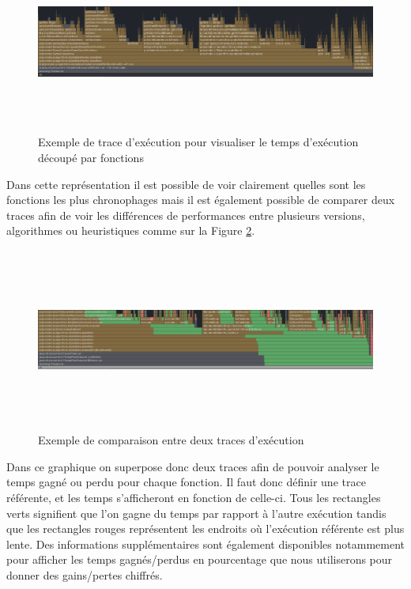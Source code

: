 \documentclass{article}
\begin{document}
\begin{figure}[h]
    \centering
    \includegraphics[width=\textwidth,height=6.0cm,keepaspectratio]{trace_example.png}
    \caption{Exemple de trace d'exécution pour visualiser le temps d'exécution découpé par fonctions}
    \label{trace_ex}
\end{figure}
\FloatBarrier

Dans cette représentation il est possible de voir clairement quelles sont les fonctions les plus chronophages mais il est également possible 
de comparer deux traces afin de voir les différences de performances entre plusieurs versions, algorithmes ou heuristiques comme sur la Figure \ref{trace_ex2}.

\begin{figure}[h]
    \centering
    \includegraphics[width=\textwidth,height=6.0cm,keepaspectratio]{trace_ex2.png}
    \caption{Exemple de comparaison entre deux traces d'exécution}
    \label{trace_ex2}
\end{figure}
\FloatBarrier

Dans ce graphique on superpose donc deux traces afin de pouvoir analyser le temps gagné ou perdu pour chaque fonction. Il faut donc définir une trace référente, et les temps
s'afficheront en fonction de celle-ci. Tous les rectangles verts signifient que l'on gagne du temps par rapport à l'autre exécution tandis que les rectangles rouges représentent
les endroits où l'exécution référente est plus lente. Des informations supplémentaires sont également disponibles notammement pour afficher les temps gagnés/perdus en pourcentage
que nous utiliserons pour donner des gains/pertes chiffrés.
\end{document}
